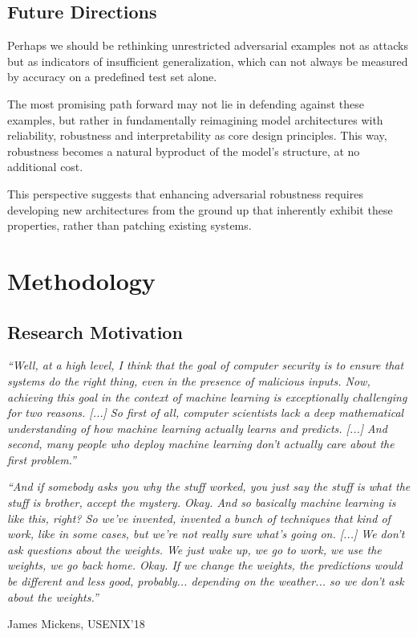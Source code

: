 \documentclass[a4paper, oneside]{discothesis}
\begin{document}
\section{Future Directions}

Perhaps we should be rethinking unrestricted adversarial examples not as attacks but as indicators of insufficient generalization, which can not always be measured by accuracy on a predefined test set alone.

The most promising path forward may not lie in defending against these examples, but rather in fundamentally reimagining model architectures with reliability, robustness and interpretability as core design principles. This way, robustness becomes a natural byproduct of the model's structure, at no additional cost.

This perspective suggests that enhancing adversarial robustness requires developing new architectures from the ground up that inherently exhibit these properties, rather than patching existing systems.

\chapter{Methodology}

\section{Research Motivation}

\begin{quotebox}
	\begin{flushright}
		\textit{``Well, at a high level, I think that the goal of computer security is to ensure that systems do the right thing, even in the presence of malicious inputs. Now, achieving this goal in the context of machine learning is exceptionally challenging for two reasons. [...] So first of all, computer scientists lack a deep mathematical understanding of how machine learning actually learns and predicts. [...] And second, many people who deploy machine learning don't actually care about the first problem.''}
		\vspace{1em}

		\textit{``And if somebody asks you why the stuff worked, you just say the stuff is what the stuff is brother, accept the mystery. Okay. And so basically machine learning is like this, right? So we've invented, invented a bunch of techniques that kind of work, like in some cases, but we're not really sure what's going on. [...] We don't ask questions about the weights. We just wake up, we go to work, we use the weights, we go back home. Okay. If we change the weights, the predictions would be different and less good, probably... depending on the weather... so we don't ask about the weights.''}
		\vspace{1em}

		\textemdash{} James Mickens, USENIX'18~\cite{218395}
	\end{flushright}
\end{quotebox}
\end{document}
